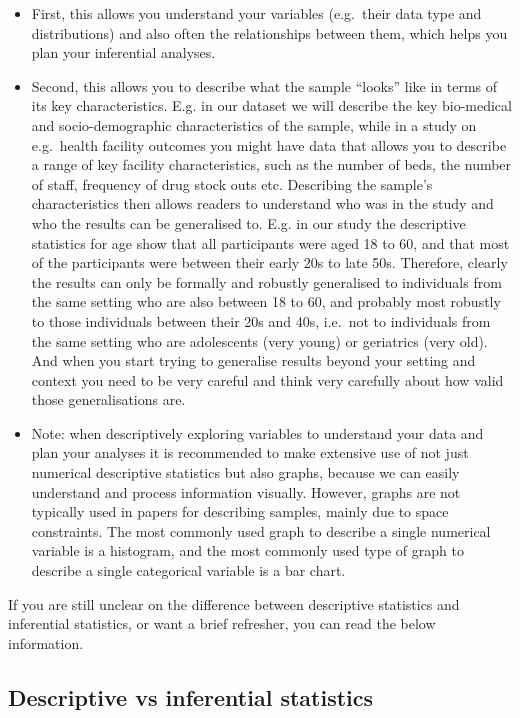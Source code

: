 \documentclass[
]{book}
\begin{document}
\begin{itemize}
\item
  First, this allows you understand your variables (e.g.~their data type and distributions) and also often the relationships between them, which helps you plan your inferential analyses.
\item
  Second, this allows you to describe what the sample ``looks'' like in terms of its key characteristics. E.g. in our dataset we will describe the key bio-medical and socio-demographic characteristics of the sample, while in a study on e.g.~health facility outcomes you might have data that allows you to describe a range of key facility characteristics, such as the number of beds, the number of staff, frequency of drug stock outs etc. Describing the sample's characteristics then allows readers to understand who was in the study and who the results can be generalised to. E.g. in our study the descriptive statistics for age show that all participants were aged 18 to 60, and that most of the participants were between their early 20s to late 50s. Therefore, clearly the results can only be formally and robustly generalised to individuals from the same setting who are also between 18 to 60, and probably most robustly to those individuals between their 20s and 40s, i.e.~not to individuals from the same setting who are adolescents (very young) or geriatrics (very old). And when you start trying to generalise results beyond your setting and context you need to be very careful and think very carefully about how valid those generalisations are.
\item
  Note: when descriptively exploring variables to understand your data and plan your analyses it is recommended to make extensive use of not just numerical descriptive statistics but also graphs, because we can easily understand and process information visually. However, graphs are not typically used in papers for describing samples, mainly due to space constraints. The most commonly used graph to describe a single numerical variable is a histogram, and the most commonly used type of graph to describe a single categorical variable is a bar chart.
\end{itemize}

If you are still unclear on the difference between descriptive statistics and inferential statistics, or want a brief refresher, you can read the below information.

\hypertarget{descriptive-vs-inferential-statistics}{%
\subsection{Descriptive vs inferential statistics}\label{descriptive-vs-inferential-statistics}}
\end{document}
